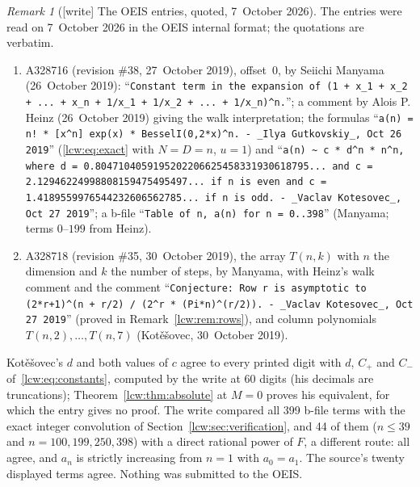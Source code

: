 \documentclass[11pt,letterpaper]{article}
\theoremstyle{remark}\newtheorem{remark}[theorem]{Remark}
\begin{document}
\begin{remark}[{[write]} The OEIS entries, quoted, 7~October 2026]\label{lcw:rem:oeis}
The entries were read on 7~October 2026 in the OEIS internal format; the
quotations are verbatim.
\begin{enumerate}[label=(\alph*)]\raggedright
\item A328716 (revision \#38, 27~October 2019), offset~$0$, by Seiichi Manyama
 (26~October 2019): ``\texttt{Constant term in the expansion of (1 + x\_1 +
 x\_2 + ... + x\_n + 1/x\_1 + 1/x\_2 + ... + 1/x\_n)\^{}n.}''; a comment by
 Alois P. Heinz (26~October 2019) giving the walk interpretation; the
 formulas ``\texttt{a(n) = n! * [x\^{}n] exp(x) * BesselI(0,2*x)\^{}n. -
 \_Ilya Gutkovskiy\_, Oct 26 2019}'' (\eqref{lcw:eq:exact} with $N=D=n$, $u=1$)
 and ``\texttt{a(n) \textasciitilde{} c * d\^{}n * n\^{}n, where d =
 0.8047104059195202206625458331930618795... and c =
 2.12946224998808159475495497... if n is even and c =
 1.4189559976544232606562785... if n is odd. - \_Vaclav Kotesovec\_, Oct 27
 2019}''; a b-file ``\texttt{Table of n, a(n) for n = 0..398}'' (Manyama;
 terms $0$--$199$ from Heinz).
\item A328718 (revision \#35, 30~October 2019), the array $T(n,k)$ with $n$
 the dimension and $k$ the number of steps, by Manyama, with Heinz's walk
 comment and the comment ``\texttt{Conjecture: Row r is asymptotic to
 (2*r+1)\^{}(n + r/2) / (2\^{}r * (Pi*n)\^{}(r/2)). - \_Vaclav Kotesovec\_,
 Oct 27 2019}'' (proved in Remark~\ref{lcw:rem:rows}), and column
 polynomials $T(n,2),\dots,T(n,7)$ (Kot\v{e}\v{s}ovec, 30~October 2019).
\end{enumerate}
Kot\v{e}\v{s}ovec's $d$ and both values of $c$ agree to every printed digit
with $d$, $C_+$ and $C_-$ of~\eqref{lcw:eq:constants}, computed by the write
at 60 digits (his decimals are truncations); Theorem~\ref{lcw:thm:absolute}
at $M=0$ proves his equivalent, for which the entry gives no proof. The
write compared all 399 b-file terms with the exact integer convolution of
Section~\ref{lcw:sec:verification}, and 44 of them ($n\le39$ and
$n=100,199,250,398$) with a direct rational power of $F$, a different route:
all agree, and $a_n$ is strictly increasing from $n=1$ with $a_0=a_1$. The
source's twenty displayed terms agree. Nothing was submitted to the OEIS.
\end{remark}
\end{document}
